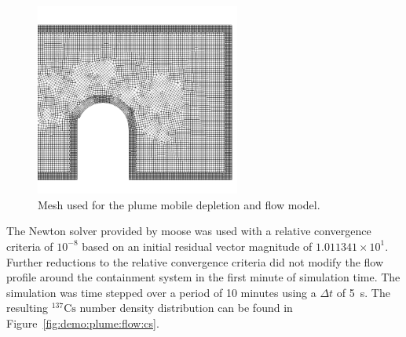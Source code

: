 \begin{figure}[H]
    \centering
    \includegraphics[width=0.6\textwidth]{images/demos/plume/flow_mesh.png}
    \caption{Mesh used for the plume mobile depletion and flow model.}
    \label{fig:demo:plume:flow:mesh}
\end{figure}
\noindent The Newton solver provided by \acrshort{moose} was used with a relative convergence criteria of $10^{-8}$ based on an initial residual vector magnitude of $1.011341\times 10^{1}$. Further reductions to the relative convergence criteria did not modify the flow profile around the containment system in the first minute of simulation time. The simulation was time stepped over a period of 10 minutes using a $\Delta t$ of 5~s. The resulting $\mathrm{^{137}Cs}$ number density distribution can be found in Figure~\ref{fig:demo:plume:flow:cs}.
